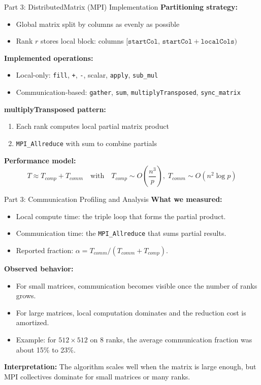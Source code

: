 \documentclass[aspectratio=169]{beamer}
\begin{document}
\begin{frame}{Part 3: DistributedMatrix (MPI) Implementation}
\textbf{Partitioning strategy:}
\begin{itemize}
  \item Global matrix split by columns as evenly as possible
  \item Rank $r$ stores local block: columns $[\texttt{startCol},\,\texttt{startCol}+\texttt{localCols})$
\end{itemize}

\textbf{Implemented operations:}
\begin{itemize}
  \item Local-only: \texttt{fill}, \texttt{+}, \texttt{-}, scalar, \texttt{apply}, \texttt{sub\_mul}
  \item Communication-based: \texttt{gather}, \texttt{sum}, \texttt{multiplyTransposed}, \texttt{sync\_matrix}
\end{itemize}

\textbf{multiplyTransposed pattern:}
\begin{enumerate}
  \item Each rank computes local partial matrix product
  \item \texttt{MPI\_Allreduce} with sum to combine partials
\end{enumerate}

\textbf{Performance model:}
\[
T \approx T_{comp} + T_{comm}
\quad\text{with}\quad
T_{comp}\sim O\!\left(\frac{n^3}{p}\right),
\;T_{comm}\sim O(n^2\log p)
\]
\end{frame}

\begin{frame}{Part 3: Communication Profiling and Analysis}
\textbf{What we measured:}
\begin{itemize}
  \item Local compute time: the triple loop that forms the partial product.
  \item Communication time: the \texttt{MPI\_Allreduce} that sums partial results.
  \item Reported fraction: $\alpha = T_{comm}/(T_{comm}+T_{comp})$.
\end{itemize}

\textbf{Observed behavior:}
\begin{itemize}
  \item For small matrices, communication becomes visible once the number of ranks grows.
  \item For large matrices, local computation dominates and the reduction cost is amortized.
  \item Example: for $512\times512$ on 8 ranks, the average communication fraction was about 15\% to 23\%.
\end{itemize}

\textbf{Interpretation:}
The algorithm scales well when the matrix is large enough, but MPI collectives dominate for small matrices or many ranks.
\end{frame}
\end{document}
